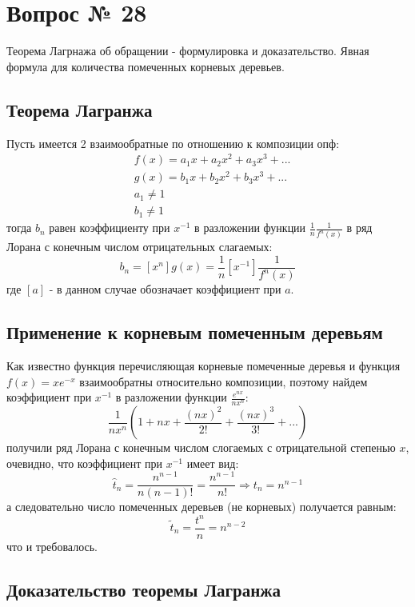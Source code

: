 \chapter{Вопрос № 28}

Теорема Лагрнажа об обращении - формулировка и доказательство. Явная формула для количества помеченных корневых деревьев.

\section{Теорема Лагранжа}

Пусть имеется 2 взаимообратные по отношению к композиции опф:
\[
	\begin{split}
		& f\left(x\right) = a_1 x + a_2 x^2 + a_3 x^3 + ... \\
		& g\left(x\right) = b_1 x + b_2 x^2 + b_3 x^3 + ... \\
		& a_1 \not= 1 \\
		& b_1 \not= 1
	\end{split}
\]
тогда $b_n$ равен коэффициенту при $x^{-1}$ в разложении функции $\frac{1}{n} \frac{1}{f^n\left(x\right)}$ в ряд Лорана с конечным числом отрицательных слагаемых:
\begin{equation}
	b_n = \left[x^n\right]g\left(x\right) = \frac{1}{n} \left[x^{-1}\right] \frac{1}{f^n\left(x\right)}
\end{equation}
где $\left[a\right]$ - в данном случае обозначает коэффициент при $a$.

\section{Применение к корневым помеченным деревьям}

Как известно функция перечисляющая корневые помеченные деревья и функция $f\left(x\right) = xe^{-x}$ взаимообратны относительно композиции, поэтому найдем коэффициент при $x^{-1}$ в разложении функции $\frac{e^{nx}}{nx^n}$:
\[
	\frac{1}{nx^n}\left(1 + nx + \frac{\left(nx\right)^2}{2!} + \frac{\left(nx\right)^3}{3!} + ...\right)
\]
получили ряд Лорана с конечным числом слогаемых с отрицательной степенью $x$, очевидно, что коэффициент при $x^{-1}$ имеет вид:
\[
	\hat t_n =\frac{n^{n-1}}{n\left(n-1\right)!} = \frac{n^{n-1}}{n!} \Rightarrow t_n = n^{n-1}
\]
а следовательно число помеченных деревьев (не корневых) получается равным:
\[
	\tilde t_n = \frac{t^n}{n} = n^{n-2}
\]
что и требовалось.

\section{Доказательство теоремы Лагранжа}

